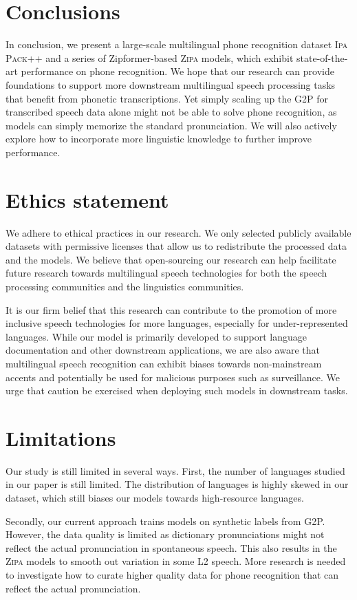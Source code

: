 \documentclass[11pt]{article}
\begin{document}
\section{Conclusions}
In conclusion, we present a large-scale multilingual phone recognition dataset \textsc{Ipa Pack++} and a series of Zipformer-based \textsc{Zipa} models, which exhibit state-of-the-art performance on phone recognition. We hope that our research can provide foundations to support more downstream multilingual speech processing tasks that benefit from phonetic transcriptions. Yet simply scaling up the G2P for transcribed speech data alone might not be able to solve phone recognition, as models can simply memorize the standard pronunciation. We will also actively explore how to incorporate more linguistic knowledge to further improve performance. 



\section*{Ethics statement}
We adhere to ethical practices in our research. We only selected publicly available datasets with permissive licenses that allow us to redistribute the processed data and the models. We believe that open-sourcing our research can help facilitate future research towards multilingual speech technologies for both the speech processing communities and the linguistics communities.

It is our firm belief that this research can contribute to the promotion of more inclusive speech technologies for more languages, especially for under-represented languages. While our model is primarily developed to support language documentation and other downstream applications, we are also aware that multilingual speech recognition can exhibit biases towards non-mainstream accents and potentially be used for malicious purposes such as surveillance. We urge that caution be exercised when deploying such models in downstream tasks. 

\section*{Limitations}
Our study is still limited in several ways. First, the number of languages studied in our paper is still limited. The distribution of languages is highly skewed in our dataset, which still biases our models towards high-resource languages. 

Secondly, our current approach trains models on synthetic labels from G2P. However, the data quality is limited as dictionary pronunciations might not reflect the actual pronunciation in spontaneous speech. This also results in the \textsc{Zipa} models to smooth out variation in some L2 speech. More research is needed to investigate how to curate higher quality data for phone recognition that can reflect the actual pronunciation. 
\end{document}
